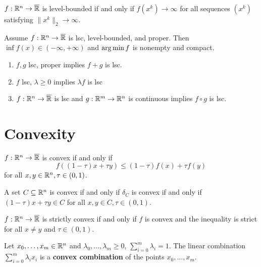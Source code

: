 \begin{defn}
  \label{sec:existence-10}
  $f: \mathbb{R}^{n} \rightarrow \overline {\mathbb{R}}$ is level-bounded if and only if
  $f(x^{k}) \rightarrow \infty$ for all sequences $(x^{k})$ satisfying
  $\| x^{k} \|_{2} \rightarrow \infty$.
\end{defn}

\begin{thm}
  \label{sec:existence-11}
  Assume $f: \mathbb{R}^{n} \rightarrow \overline {\mathbb{R}}$ is lsc, level-bounded,
  and proper.  Then $\inf f(x) \in (-\infty, +\infty)$ and $\operatorname*{arg\,min} f$
  is nonempty and compact.
\end{thm}

\begin{thm}
  \label{sec:existence-12}
  \begin{enumerate}
  \item $f, g$ lsc, proper implies $f + g$ is lsc.
  \item $f$ lsc, $\lambda \geq 0$ implies $\lambda f$ is lsc
  \item $f: \mathbb{R}^{n} \rightarrow \overline {\mathbb{R}}$ is lsc and $g: \mathbb{R}^{m}
    \rightarrow \mathbb{R}^{n}$ is continuous implies $f \circ g$ is lsc.
  \end{enumerate}
\end{thm}

\section{Convexity}
\label{sec:convexity}

\begin{defn}
  \label{sec:convexity-1}
  $f: \mathbb{R}^{n} \rightarrow \overline {\mathbb{R}}$ is convex if and only if
  \begin{equation}
    \label{eq:5}
    f((1 - \tau)x + \tau y) \leq (1 - \tau) f(x) + \tau f(y)
  \end{equation} for all $x, y \in \mathbb{R}^{n}, \tau \in (0, 1)$.

  A set $C \subseteq \mathbb{R}^{n}$ is convex if and only if $\delta_{C}$ is
  convex if and only if $(1 - \tau) x + \tau y \in C$ for all $x, y
  \in C, \tau \in (0, 1)$.

  $f: \mathbb{R}^{n} \rightarrow \overline {\mathbb{R}}$ is strictly convex if and only
  if $f$ is convex and the inequality is strict for all $x \neq y$ and
  $\tau \in (0, 1)$.
\end{defn}

\begin{defn}
  \label{sec:convexity-2}
  Let $x_{0}, \dots, x_{m} \in \mathbb{R}^{n}$  and $\lambda_{0}, \dots,
  \lambda_{m} \geq 0$, $\sum_{i=0}^{m} \lambda_{i} = 1$.  The linear
  combination $\sum_{i=0}^{m} \lambda_{i} x_{i}$ is a \textbf{convex
  combination} of the points $x_{0}, \dots, x_{m}$.
\end{defn}

